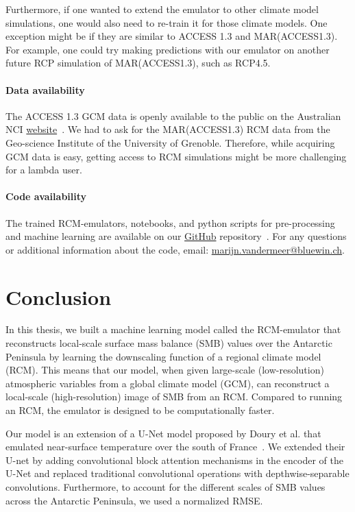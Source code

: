 \documentclass[a4paper,11pt,oneside]{report}
\begin{document}
Furthermore, if one wanted to extend the emulator to other climate model simulations, one would also need to re-train it for those climate models. One exception might be if they are similar to ACCESS 1.3 and MAR(ACCESS1.3). For example, one could try making predictions with our emulator on another future RCP simulation of MAR(ACCESS1.3), such as RCP4.5.  

\subsubsection{Data availability}
The ACCESS 1.3 GCM data is openly available to the public on the Australian NCI \href{https://esgf.nci.org.au/search/esgf-nci/}{website}~\cite{NCI}. We had to ask for the MAR(ACCESS1.3) RCM data from the Geo-science Institute of the University of Grenoble. Therefore, while acquiring GCM data is easy, getting access to RCM simulations might be more challenging for a lambda user.

\subsubsection{Code availability}
The trained RCM-emulators, notebooks, and python scripts for pre-processing and machine learning are available on our \href{https://github.com/marvande/master-thesis}{GitHub} repository~\cite{GitHub}. For any questions or additional information about the code, email: \href{mailto:marijn.vandermeer@bluewin.ch}{marijn.vandermeer@bluewin.ch}. 


\chapter{Conclusion}

In this thesis, we built a machine learning model called the RCM-emulator that reconstructs local-scale surface mass balance (SMB) values over the Antarctic Peninsula by learning the downscaling function of a regional climate model (RCM). This means that our model, when given large-scale (low-resolution) atmospheric variables from a global climate model (GCM), can reconstruct a local-scale (high-resolution) image of SMB from an RCM. Compared to running an RCM, the emulator is designed to be computationally faster.   

Our model is an extension of a U-Net model proposed by Doury et al. that emulated near-surface temperature over the south of France~\cite{Doury}. We extended their U-net by adding convolutional block attention mechanisms in the encoder of the U-Net and replaced traditional convolutional operations with depthwise-separable convolutions. Furthermore, to account for the different scales of SMB values across the Antarctic Peninsula, we used a normalized RMSE. 
\end{document}
